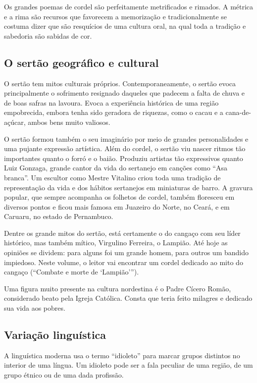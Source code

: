 Os grandes poemas de cordel são perfeitamente metrificados e rimados. A
métrica e a rima são recursos que favorecem a memorização e
tradicionalmente se costuma dizer que são resquícios de uma cultura
oral, na qual toda a tradição e sabedoria são sabidas de cor. 


\subsection{O sertão geográfico e cultural}

O sertão tem mitos culturais próprios. Contemporaneamente, o sertão
evoca principalmente o sofrimento resignado daqueles que padecem a
falta de chuva e de boas safras na lavoura. Evoca a experiência
histórica de uma região empobrecida, embora tenha sido geradora de
riquezas, como o cacau e a cana-de-açúcar, ambos bens muito valiosos. 

O sertão formou também o seu imaginário por meio de grandes
personalidades e uma pujante expressão artística. Além do cordel, o
sertão viu nascer ritmos tão importantes quanto o forró e o baião.
Produziu artistas tão expressivos quanto Luiz Gonzaga, grande cantor da
vida do sertanejo em canções como ``Asa
branca''. Um escultor como Mestre Vitalino criou toda
uma tradição de representação da vida e dos hábitos sertanejos em
miniaturas de barro. A gravura popular, que sempre acompanha os
folhetos de cordel, também floresceu em diversos pontos e ficou mais
famosa em Juazeiro do Norte, no Ceará, e em Caruaru, no estado de
Pernambuco. 

Dentre os grande mitos do sertão, está certamente o do cangaço com seu
líder histórico, mas também mítico, Virgulino Ferreira, o Lampião. Até
hoje as opiniões se dividem: para alguns foi um grande homem, para
outros um bandido impiedoso. Neste volume, o leitor vai encontrar 
um cordel dedicado ao mito do cangaço (``Combate e morte de `Lampião'''). 

Uma figura muito presente na cultura nordestina é o Padre Cícero Romão,
considerado beato pela Igreja Católica. Consta que teria feito milagres
e dedicado sua vida aos pobres. 

\subsection{Variação linguística}

A linguística moderna usa o termo
``idioleto'' para marcar grupos
distintos no interior de uma língua. Um idioleto pode ser a fala
peculiar de uma região, de um grupo étnico ou de uma dada profissão. 

